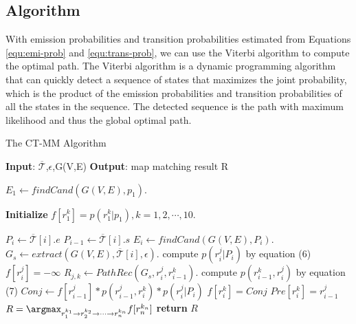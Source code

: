 \subsection{Algorithm}

With emission probabilities and transition probabilities estimated from Equations
\ref{equ:emi-prob} and \ref{equ:trans-prob}, we can use the Viterbi algorithm to
compute the optimal path. The Viterbi algorithm is a dynamic programming
algorithm that can quickly detect a sequence of states that maximizes the joint
probability, which is the product of the emission probabilities and transition
probabilities of all the states in the sequence. The detected sequence is the
path with maximum likelihood and thus the global optimal path.



\begin{large}
\begin{algorithm}
\caption{The CT-MM Algorithm}\label{alg:viterbi}
\small
\begin{algorithmic}[1]
 \State  \textbf{Input}: $\overline{\mathcal{T}}$,$\epsilon$,G(V,E)
 \State  \textbf{Output}: map matching result R

 \State $E_1 \gets findCand(G(V,E),p_1)$.

 \State \textbf{Initialize} $f[r_1^k] = p(r_{1}^k|p_{1}), k = 1,2,\cdots,10$.

   \State $P_i \gets \overline{\mathcal{T}}[i].e$
   \State $P_{i-1} \gets \overline{\mathcal{T}}[i].s$
   \State $E_i \gets findCand(G(V,E),P_i)$.
   \State $G_s \gets extract(G(V,E),\overline{\mathcal{T}}[i],\epsilon)$.
      \State compute $p(r_{i}^j|P_{i})$ by equation (6)
      \State $f[r_{i}^j] = -\infty$
      \State $R_{j,k} \gets PathRec(G_s,r_i^j,r_{i-1}^k)$.
      \State compute $p(r_{i-1}^k,r_{i}^j)$ by equation (7)
      \State $Conj\gets f[r_{i-1}^j] * p(r_{i-1}^j,r_{i}^k) * p(r_{i}^j|P_{i})$
        \State $f[r_{i}^k] = Conj$
        \State $Pre[r_{i}^k] = r_{i-1}^j$
      \EndIf
    \EndFor
  \EndFor
  \EndFor
  \State $R = \argmax_{r_1^{k_1}\rightarrow r_2^{k_2}\rightarrow \cdots \rightarrow r_n^{k_n}}f[r_{n}^{k_n}]$
\State \textbf{return} $R$

\end{algorithmic}
\end{algorithm}
\end{large}


